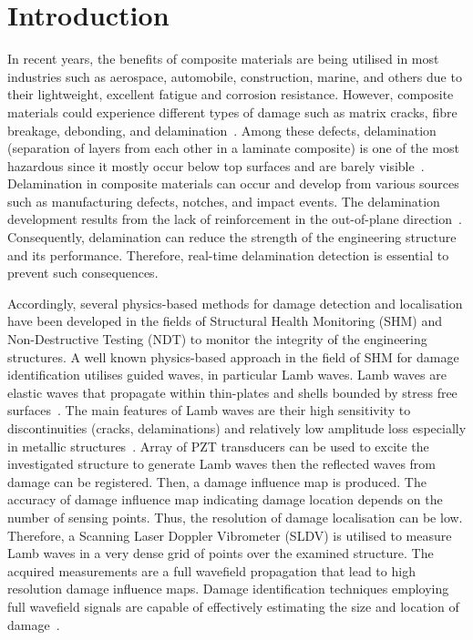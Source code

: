 \section{Introduction}
In recent years, the benefits of composite materials are being utilised in most industries such as aerospace, automobile, construction, marine, and others due to their lightweight, excellent fatigue and corrosion resistance.
However, composite materials could experience different types of damage such as matrix cracks, fibre breakage, debonding, and delamination~\cite{ip2004delamination, smith2009composite}. 
Among these defects, delamination (separation of layers from each other in a laminate composite) is one of the most hazardous since it mostly occur below top surfaces and are barely visible~\cite{Cai2012}.
Delamination in composite materials can occur and develop from various sources such as  manufacturing defects, notches, and impact events.
The delamination development results from the lack of reinforcement in the out-of-plane direction~\cite{Cai2012}.
Consequently, delamination can reduce the strength of the engineering structure and its performance. 
Therefore, real-time delamination detection is essential to prevent such consequences. 
 
Accordingly, several physics-based methods for damage detection and localisation have been developed in the fields of Structural Health Monitoring (SHM) and Non-Destructive Testing (NDT) to monitor the integrity of the engineering structures.
A well known physics-based approach in the field of SHM for damage identification utilises guided waves, in particular Lamb waves.
Lamb waves are elastic waves that propagate within thin-plates and shells bounded by stress free surfaces~\cite{mitra2016guided}.
The main features of Lamb waves are their high sensitivity to discontinuities (cracks, delaminations) and relatively low amplitude loss especially in metallic structures~\cite{Keulen2014}.
Array of PZT transducers can be used to excite the investigated structure to generate Lamb waves then the reflected waves from damage can be registered. 
Then, a damage influence map is produced.
The accuracy of damage influence map indicating damage location depends on the number of sensing points. 
Thus, the resolution of damage localisation can be low.
Therefore, a Scanning Laser Doppler Vibrometer (SLDV) is utilised to measure Lamb waves in a very dense grid of points over the examined structure.
The acquired measurements are a full wavefield propagation that lead to high resolution damage influence maps.
Damage identification techniques employing full wavefield signals are capable of effectively estimating the size and location of damage~\cite{Girolamo2018a, kudela2018impact}. 

